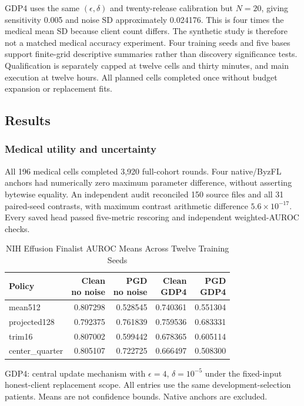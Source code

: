 \documentclass[conference,letterpaper]{IEEEtran}
\begin{document}
GDP4 uses the same $(\epsilon,\delta)$ and twenty-release calibration but $N=20$, giving sensitivity 0.005 and noise SD approximately 0.024176. This is four times the medical mean SD because client count differs. The synthetic study is therefore not a matched medical accuracy experiment. Four training seeds and five bases support finite-grid descriptive summaries rather than discovery significance tests. Qualification is separately capped at twelve cells and thirty minutes, and main execution at twelve hours. All planned cells completed once without budget expansion or replacement fits.

\subsection{Results}
\subsubsection{Medical utility and uncertainty}
All 196 medical cells completed 3,920 full-cohort rounds. Four native/ByzFL anchors had numerically zero maximum parameter difference, without asserting bytewise equality. An independent audit reconciled 150 source files and all 31 paired-seed contrasts, with maximum contrast arithmetic difference $5.6\times10^{-17}$. Every saved head passed five-metric rescoring and independent weighted-AUROC checks.

\begin{table}[t]
\caption{NIH Effusion Finalist AUROC Means Across Twelve Training Seeds}
\label{tab:medical}
\centering\footnotesize
\begin{tabular}{@{}lrrrr@{}}\toprule
Policy & \shortstack{Clean\\no noise} & \shortstack{PGD\\no noise} & \shortstack{Clean\\GDP4} & \shortstack{PGD\\GDP4}\\\midrule
mean512 &0.807298&0.528545&0.740361&0.551304\\
projected128 &0.792375&0.761839&0.759536&0.683331\\
trim16 &0.807002&0.599442&0.678365&0.605114\\
center\_quarter &0.805107&0.722725&0.666497&0.508300\\\bottomrule
\end{tabular}
\vspace{2pt}
\begin{minipage}{\columnwidth}\footnotesize
GDP4: central update mechanism with $\epsilon=4$, $\delta=10^{-5}$ under the fixed-input honest-client replacement scope. All entries use the same development-selection patients. Means are not confidence bounds. Native anchors are excluded.
\end{minipage}
\end{table}
\end{document}
